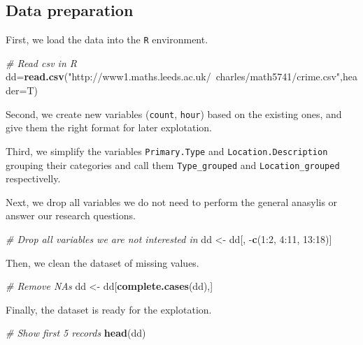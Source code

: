 \documentclass[]{article}
\newenvironment{Shaded}{\begin{snugshade}}{\end{snugshade}}
\newcommand{\KeywordTok}[1]{\textcolor[rgb]{0.13,0.29,0.53}{\textbf{{#1}}}}
\newcommand{\DataTypeTok}[1]{\textcolor[rgb]{0.13,0.29,0.53}{{#1}}}
\newcommand{\DecValTok}[1]{\textcolor[rgb]{0.00,0.00,0.81}{{#1}}}
\newcommand{\StringTok}[1]{\textcolor[rgb]{0.31,0.60,0.02}{{#1}}}
\newcommand{\CommentTok}[1]{\textcolor[rgb]{0.56,0.35,0.01}{\textit{{#1}}}}
\newcommand{\NormalTok}[1]{{#1}}
\begin{document}
\subsection{Data preparation}\label{data-preparation}

First, we load the data into the \texttt{R} environment.

\begin{Shaded}
\begin{Highlighting}[]
\CommentTok{# Read csv in R}
\NormalTok{dd=}\KeywordTok{read.csv}\NormalTok{(}\StringTok{"http://www1.maths.leeds.ac.uk/~charles/math5741/crime.csv"}\NormalTok{,}\DataTypeTok{header=}\NormalTok{T)}
\end{Highlighting}
\end{Shaded}

Second, we create new variables (\texttt{count}, \texttt{hour}) based on
the existing ones, and give them the right format for later explotation.

Third, we simplify the variables \texttt{Primary.Type} and
\texttt{Location.Description} grouping their categories and call them
\texttt{Type\_grouped} and \texttt{Location\_grouped} respectivelly.

Next, we drop all variables we do not need to perform the general
anasylis or answer our research questions.

\begin{Shaded}
\begin{Highlighting}[]
\CommentTok{# Drop all variables we are not interested in}
\NormalTok{dd <-}\StringTok{ }\NormalTok{dd[, -}\KeywordTok{c}\NormalTok{(}\DecValTok{1}\NormalTok{:}\DecValTok{2}\NormalTok{, }\DecValTok{4}\NormalTok{:}\DecValTok{11}\NormalTok{, }\DecValTok{13}\NormalTok{:}\DecValTok{18}\NormalTok{)]}
\end{Highlighting}
\end{Shaded}

Then, we clean the dataset of missing values.

\begin{Shaded}
\begin{Highlighting}[]
\CommentTok{# Remove NAs}
\NormalTok{dd <-}\StringTok{ }\NormalTok{dd[}\KeywordTok{complete.cases}\NormalTok{(dd),]}
\end{Highlighting}
\end{Shaded}

Finally, the dataset is ready for the explotation.

\begin{Shaded}
\begin{Highlighting}[]
\CommentTok{# Show first 5 records}
\KeywordTok{head}\NormalTok{(dd)}
\end{Highlighting}
\end{Shaded}
\end{document}
